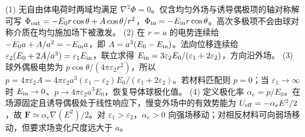 (1) 无自由体电荷时两域均满足 \(\nabla^2\Phi=0\)。仅含均匀外场与诱导偶极项的轴对称解可写 \(\Phi_{\rm out}=-E_0r\cos\theta+A\cos\theta/r^2\)，\(\Phi_{\rm in}=-E_{\rm in}r\cos\theta\)。高次多极项不会由球对称介质在均匀施加场下被激发。
(2) 在 \(r=a\) 的电势连续给 \(-E_0a+A/a^2=-E_{\rm in}a\)，即 \(A=a^3(E_0-E_{\rm in})\)。法向位移连续给 \(\varepsilon_2(E_0+2A/a^3)=\varepsilon_1E_{\rm in}\)，联立求得 \(E_{\rm in}=3\varepsilon_2E_0/(\varepsilon_1+2\varepsilon_2)\)，方向沿外场。
(3) 球外偶极电势为 \(p\cos\theta/(4\pi\varepsilon_2r^2)\)，所以 \(p=4\pi\varepsilon_2A=4\pi\varepsilon_2a^3(\varepsilon_1-\varepsilon_2)E_0/(\varepsilon_1+2\varepsilon_2)\)。若材料匹配则 \(p=0\)；当 \(\varepsilon_1\to\infty\) 时 \(E_{\rm in}\to0\)、\(p\to4\pi\varepsilon_2a^3E_0\)，恢复导体球极化值。
(4) 定义极化率 \(\alpha_e=p/E_0\)。在场源固定且诱导偶极处于线性响应下，慢变外场中的有效势能为 \(U_{\rm eff}=-\alpha_eE^2/2\)，故 \(\boldsymbol F\simeq\alpha_e\nabla(E^2)/2\)。对 \(\varepsilon_1>\varepsilon_2\)，\(\alpha_e>0\) 向强场移动；对相反材料可向弱场移动，但要求场变化尺度远大于 \(a\)。

